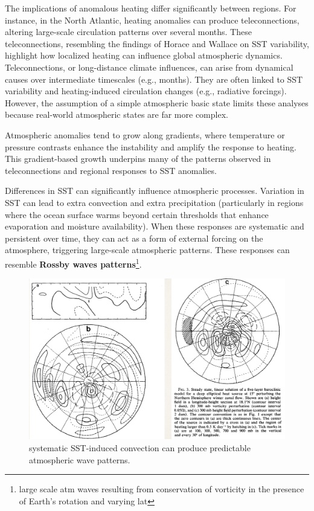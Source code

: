 The implications of anomalous heating differ significantly between regions. For instance, in the North Atlantic, heating anomalies can produce teleconnections, altering large-scale circulation patterns over several months. These teleconnections, resembling the findings of Horace and Wallace on SST variability, highlight how localized heating can influence global atmospheric dynamics.\\
[0.25cm]


Teleconnections, or long-distance climate influences, can arise from dynamical causes over intermediate timescales (e.g., months). They are often linked to SST variability and heating-induced circulation changes (e.g., radiative forcings). However, the assumption of a simple atmospheric basic state limits these analyses because real-world atmospheric states are far more complex.

Atmospheric anomalies tend to grow along gradients, where temperature or pressure contrasts enhance the instability and amplify the response to heating. This gradient-based growth underpins many of the patterns observed in teleconnections and regional responses to SST anomalies.


Differences in SST can significantly influence atmospheric processes. Variation in SST can lead to extra convection and extra precipitation (particularly in regions where the ocean surface warms beyond certain thresholds that enhance evaporation and moisture availability). When these responses are systematic and persistent over time, they can act as a form of external forcing on the atmosphere, triggering large-scale atmospheric patterns. These responses can resemble \textbf{Rossby waves patterns}\footnote{large scale atm waves resulting from conservation of vorticity in the presence of Earth's rotation and varying lat}.

\begin{figure}[htpb]
	\centering
	\includegraphics[width=0.5\linewidth]{upload/imagewavesconn.png}
	\caption{systematic SST-induced convection can produce predictable atmospheric wave patterns.}

\end{figure}
